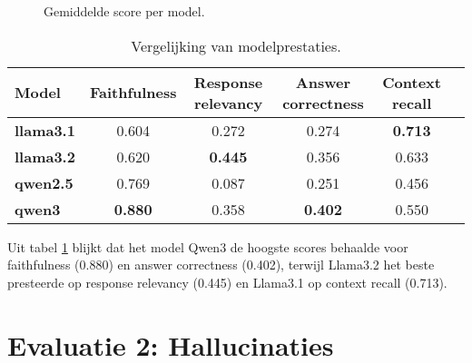 \begin{figure}[H]
    \centering
    \caption{Gemiddelde score per model.}
    \label{fig:gemiddelde_score_per_model}
\end{figure}

\begin{table}[H]
    \begin{tabular}{|l|c|c|c|c|c|}
        \hline
        \textbf{Model} & \textbf{Faithfulness} & \textbf{Response relevancy} & \textbf{Answer correctness} & \textbf{Context recall} \\
        \hline
        \textbf{llama3.1} & 0.604 & 0.272 & 0.274 & \textbf{0.713} \\
        \textbf{llama3.2} & 0.620 & \textbf{0.445} & 0.356 & 0.633 \\
        \textbf{qwen2.5}  & 0.769 & 0.087 & 0.251 & 0.456 \\
        \textbf{qwen3}    & \textbf{0.880} & 0.358 & \textbf{0.402} & 0.550 \\
        \hline
    \end{tabular}
    \caption{Vergelijking van modelprestaties.}
    \label{tab:modelvergelijking}
\end{table}

Uit tabel \ref{tab:modelvergelijking} blijkt dat het model Qwen3 de hoogste scores behaalde voor faithfulness (0.880) en answer correctness (0.402), terwijl Llama3.2 het beste presteerde op response relevancy (0.445) en Llama3.1 op context recall (0.713).

\section{Evaluatie 2: Hallucinaties}



